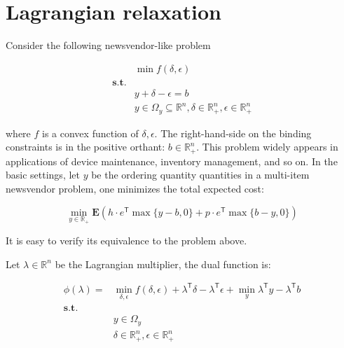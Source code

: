 \documentclass[
  a4paper,
,tablecaptionabove
]{scrartcl}
\author{Chuwen}
\date{\today}
\title{}
\author{Chuwen}
\numberwithin{equation}{section}
\begin{document}


{
\setcounter{tocdepth}{3}
\tableofcontents
}
\hypertarget{lagrangian-relaxation}{%
  \section{Lagrangian relaxation}\label{lagrangian-relaxation}}

Consider the following newsvendor-like problem

\[\begin{aligned}
                  & \min f(\delta, \epsilon)                                                                       \\
    \mathbf{s.t.} &                                                                                                \\
                  & y + \delta - \epsilon = b                                                                      \\
                  & y \in \Omega_y \subseteq \mathbb{R}^n, \delta \in \mathbb{R}^n_+ , \epsilon \in \mathbb{R}^n_+
  \end{aligned}\]

where \(f\) is a convex function of \(\delta, \epsilon\). The
right-hand-side on the binding constraints is in the positive orthant:
\(b \in \mathbb R_+^n.\) This problem widely appears in applications of
device maintenance, inventory management, and so on. In the basic
settings, let \(y\) be the ordering quantity quantities in a multi-item
newsvendor problem, one minimizes the total expected cost:

\[\min_{y \in \mathbb R_+} \mathbf E\left(h\cdot e^\mathsf{T} \max\{y - b,  0\} + p \cdot e^\mathsf{T} \max\{b - y,  0\}\right)\]

It is easy to verify its equivalence to the problem above.

Let \(\lambda\in\mathbb{R}^n\) be the Lagrangian multiplier, the dual
function is:

\[\begin{aligned}
    \phi(\lambda) = & \min_{\delta, \epsilon} f(\delta, \epsilon) + \lambda^\mathsf{T}\delta - \lambda^\mathsf{T} \epsilon+ \min_y \lambda^\mathsf{T} y - \lambda^\mathsf{T} b \\
    \mathbf{s.t.}   &                                                                                                                                                          \\
                    & y \in \Omega_y                                                                                                                                           \\
                    & \delta \in \mathbb{R}^n_+ , \epsilon \in \mathbb{R}^n_+
  \end{aligned}\]
\end{document}
